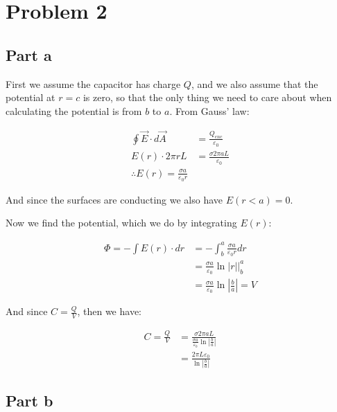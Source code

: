 \documentclass{article}
\theoremstyle{definition}
\numberwithin{equation}{section}
\numberwithin{definition}{section}
\begin{document}

    \section{Problem 2}

    \subsection{Part a}

    First we assume the capacitor has charge $Q$, and we also assume that the potential at $r = c$ is zero, so that the only thing we need to care about when calculating the potential is from $b$ to $a$. From Gauss' law:

    \begin{align*}
        \oint \vec E \cdot d\vec A &= \frac{Q_{enc}}{\varepsilon_0}\\
        E(r) \cdot 2\pi r L &= \frac{\sigma 2\pi a L}{\varepsilon_0}\\
        \therefore E(r) = \frac{\sigma a}{\varepsilon_0 r}
    \end{align*}

    And since the surfaces are conducting we also have $E(r<a) = 0$.

    \medskip

    Now we find the potential, which we do by integrating $E(r)$:

    \begin{align*}
        \Phi = -\int E(r) \cdot dr &= -\int_b^a \frac{\sigma a}{\varepsilon_0 r} dr \\
        &= \frac{\sigma a}{\varepsilon_0} \ln \left|r\right|\bigg|_b^a\\
        &= \frac{\sigma a}{\varepsilon_0}\ln \left|\frac{b}{a}\right| = V
    \end{align*}

    And since $C = \frac{Q}{V}$, then we have: 

    \begin{align*}
        C = \frac{Q}{V} &= \frac{\sigma 2\pi a L}{\frac{\sigma a}{\varepsilon_0} \ln \left|\frac{b}{a}\right|}\\
        &= \frac{2\pi L\varepsilon_0}{\ln\left|\frac{b}{a}\right|}
    \end{align*}

    \subsection{Part b}
\end{document}
